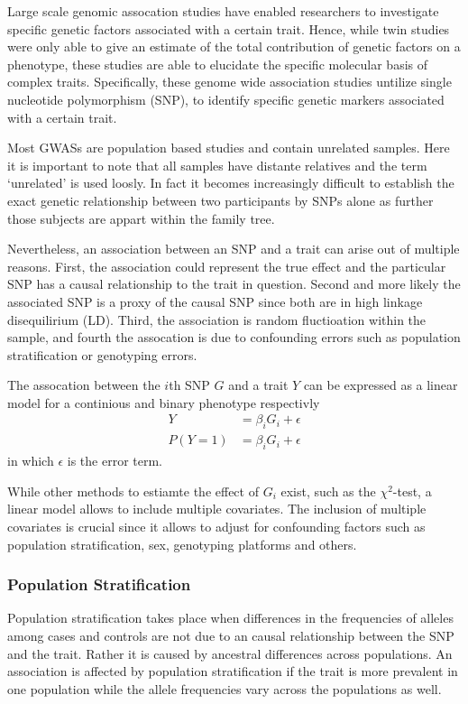 Large scale genomic assocation studies have enabled researchers to investigate specific genetic factors associated with a certain trait.
Hence, while twin studies were only able to give an estimate of the total contribution of genetic factors on a phenotype, these studies are able to elucidate the specific molecular basis of complex traits.
Specifically, these genome wide association studies untilize single nucleotide polymorphism (SNP), to identify specific genetic markers associated with a certain trait.  

Most GWASs are population based studies and contain unrelated samples.
Here it is important to note that all samples have distante relatives and the term `unrelated' is used loosly.
In fact it becomes increasingly difficult to establish the exact genetic relationship between two participants by SNPs alone as further those subjects are appart within the family tree.

Nevertheless, an association between an SNP and a trait can arise out of multiple reasons.
First, the association could represent the true effect and the particular SNP has a causal relationship to the trait in question.
Second and more likely the associated SNP is a proxy of the causal SNP since both are in high linkage disequilirium (LD).
Third, the association is random fluctioation within the sample, and fourth the assocation is due to confounding errors such as population stratification or genotyping errors.

The assocation between the $i$th SNP $G$ and a trait $Y$ can be expressed as a linear model for a continious and binary phenotype respectivly
\begin{align}
  Y &= \beta_{i}G_{i}+\epsilon \label{eq:gwas_identity}\\
  P(Y=1) &= \beta_{i}G_{i}+\epsilon \label{eq:gwas_logistic}
\end{align}
in which $\epsilon$ is the error term.

While other methods to estiamte the effect of $G_i$ exist, such as the $\chi^2$-test, a linear model allows to include multiple covariates.
The inclusion of multiple covariates is crucial since it allows to adjust for confounding factors such as population stratification, sex, genotyping platforms and others.

\subsubsection{Population Stratification}
\label{ssub:population_stratification}
Population stratification takes place when differences in the frequencies of alleles among cases and controls are not due to an causal relationship between the SNP and the trait.
Rather it is caused by ancestral differences across populations.
An association is affected by population stratification if the trait is more prevalent in one population while the allele frequencies vary across the populations as well.

